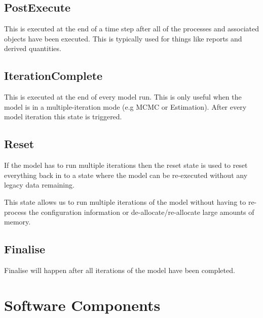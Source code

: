 \documentclass[a4paper,11pt,twoside,pdftex,draft]{article}
\begin{document}
\hypertarget{postexecute}{%
\subsection[PostExecute]{\texorpdfstring{\protect\hypertarget{anchor-24}{}{}PostExecute}{PostExecute}}\label{postexecute}}

This is executed at the end of a time step after all of the processes
and associated objects have been executed. This is typically used for
things like reports and derived quantities.

\hypertarget{iterationcomplete}{%
\subsection[IterationComplete]{\texorpdfstring{\protect\hypertarget{anchor-25}{}{}IterationComplete}{IterationComplete}}\label{iterationcomplete}}

This is executed at the end of every model run. This is only useful when
the model is in a multiple-iteration mode (e.g MCMC or Estimation).
After every model iteration this state is triggered.

\hypertarget{reset}{%
\subsection[Reset]{\texorpdfstring{\protect\hypertarget{anchor-26}{}{}Reset}{Reset}}\label{reset}}

If the model has to run multiple iterations then the reset state is used
to reset everything back in to a state where the model can be
re-executed without any legacy data remaining.

This state allows us to run multiple iterations of the model without
having to re-process the configuration information or
de-allocate/re-allocate large amounts of memory.

\hypertarget{finalise}{%
\subsection[Finalise]{\texorpdfstring{\protect\hypertarget{anchor-27}{}{}Finalise}{Finalise}}\label{finalise}}

Finalise will happen after all iterations of the model have been
completed.

\hypertarget{software-components}{%
\section[Software
Components]{\texorpdfstring{\protect\hypertarget{anchor-28}{}{}Software
Components}{Software Components}}\label{software-components}}
\end{document}
